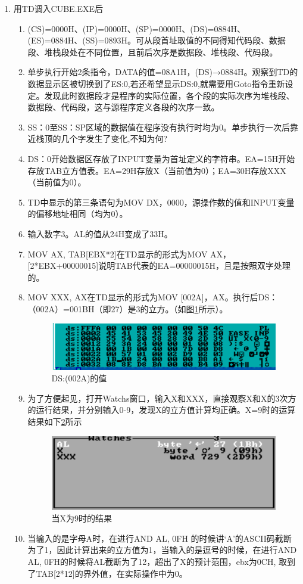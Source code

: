 \documentclass{article}
\begin{document}
\begin{enumerate}
		\item 用TD调入CUBE.EXE后
			\begin{enumerate}
				\item (CS)=0000H、(IP)=0000H、(SP)=0000H、(DS)=0884H、(ES)=0884H、(SS)=0893H。可从段首址取值的不同得知代码段、数据段、堆栈段处在不同位置，且前后次序是数据段、堆栈段、代码段。
				\item 单步执行开始2条指令，DATA的值=08A1H，(DS)→0884H。观察到TD的数据显示区被切换到了ES:0,若还希望显示DS:0,就需要用Goto指令重新设定。发现此时数据段才是程序的实际位置，各个段的实际次序为堆栈段、数据段、代码段，这与源程序定义各段的次序一致。
				\item SS：0至SS：SP区域的数据值在程序没有执行时均为0。单步执行一次后靠近栈顶的几个字发生了变化,不知为何?
				\item DS：0开始数据区存放了INPUT变量为首址定义的字符串。EA=15H开始存放TAB立方值表。EA=29H存放X（当前值为0）；EA=30H存放XXX（当前值为0）。
				\item TD中显示的第三条语句为MOV DX，0000，源操作数的值和INPUT变量的偏移地址相同（均为0）。
				\item 输入数字3。AL的值从24H变成了33H。
				\item MOV  AX, TAB[EBX*2]在TD显示的形式为MOV AX，[2*EBX+00000015]说明TAB代表的EA=00000015H，且是按照双字处理的。
				\item MOV  XXX, AX在TD显示的形式为MOV [002A]，AX。执行后DS：（002A）=001BH（即27）是3的立方。（如图\ref{fig:dsvalue}所示）。
					\begin{figure}[H]
						\centering
						\includegraphics[width=0.8\linewidth]{res/homework_1/fig7.png}
						\caption{DS:(002A)的值}
						\label{fig:dsvalue}
					\end{figure}
				\item 为了方便起见，打开Watchs窗口，输入X和XXX，直接观察X和X的3次方的运行结果，并分别输入0-9，发现X的立方值计算均正确。X=9时的运算结果如下\ref{fig:xisnine}所示
					\begin{figure}[H]
						\centering
						\includegraphics[width=0.8\linewidth]{res/homework_1/fig8.png}
						\caption{当X为9时的结果}
						\label{fig:xisnine}
					\end{figure}
				\item 当输入的是字母A时，在进行AND AL, 0FH 的时候讲‘A’的ASCII码截断为了1，因此计算出来的立方值为1，当输入的是逗号的时候，在进行AND AL, 0FH的时候将AL截断为了12，超出了X的预计范围，ebx为0CH, 取到了TAB[2*12]的界外值，在实际操作中为0。
			\end{enumerate}


\end{enumerate}
\end{document}
